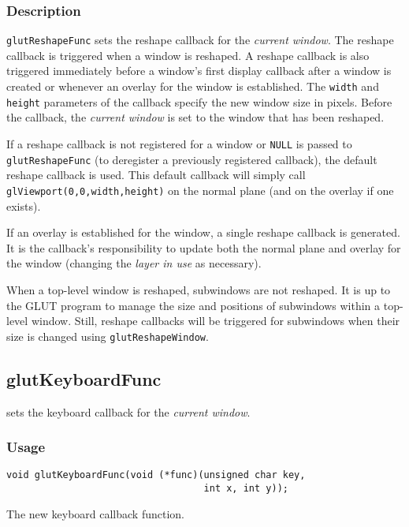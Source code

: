 \subsubsection*{Description}

{\tt glutReshapeFunc} sets the reshape callback for the {\em current window}.
The reshape callback is triggered when a window is reshaped.
A reshape callback is also triggered immediately before a window's first display callback
after a window is created or whenever an overlay for the window is established.
The {\tt width} and {\tt height} parameters of the callback
specify the new window size in pixels.  Before the callback, the {\em current
window} is set to the window that has been reshaped.

If a reshape callback is not registered for a window or {\tt NULL} is
passed to {\tt glutReshapeFunc} (to deregister a previously registered
callback), the default reshape callback is used.  This default callback
will simply call {\tt glViewport(0,0,width,height)} on the normal plane
(and on the overlay if one exists).

If an overlay is established for the window, a single reshape callback is generated.
It is the callback's responsibility to update both the normal plane and
overlay for the window (changing the {\em layer in use} as necessary).

When a top-level window is reshaped, subwindows are not reshaped.  It is
up to the GLUT program to manage the size and positions of subwindows
within a top-level window.  Still, reshape callbacks will be triggered for
subwindows when their size is changed using {\tt glutReshapeWindow}.

\subsection{glutKeyboardFunc}

 sets the keyboard callback for the {\em current window}.

\subsubsection*{Usage}

\begin{verbatim}
void glutKeyboardFunc(void (*func)(unsigned char key,
                                   int x, int y));
\end{verbatim}
\begin{description}
\itemsep 0in
\item[{\tt func}]
The new keyboard callback function.
\end{description}


